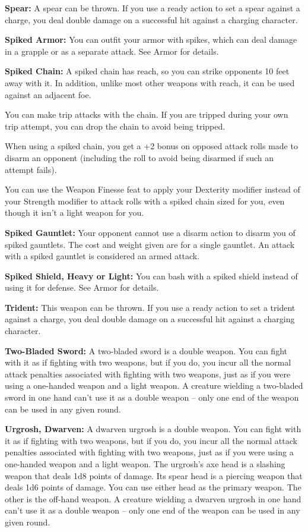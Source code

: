 \textbf{Spear:} A spear can be thrown. If you use a ready action to set a spear 
against a charge, you deal double damage on a successful hit against a charging 
character.

\textbf{Spiked Armor:} You can outfit your armor with spikes, which can deal damage 
in a grapple or as a separate attack. See Armor for details.

\textbf{Spiked Chain:} A spiked chain has reach, so you can strike opponents 10 
feet away with it. In addition, unlike most other weapons with reach, it can be 
used against an adjacent foe.

You can make trip attacks with the chain. If you are tripped during your own trip 
attempt, you can drop the chain to avoid being tripped.

When using a spiked chain, you get a +2 bonus on opposed attack rolls made to disarm 
an opponent (including the roll to avoid being disarmed if such an attempt fails).

You can use the Weapon Finesse feat to apply your Dexterity modifier instead of 
your Strength modifier to attack rolls with a spiked chain sized for you, even 
though it isn't a light weapon for you.

\textbf{Spiked Gauntlet:} Your opponent cannot use a disarm action to disarm you 
of spiked gauntlets. The cost and weight given are for a single gauntlet. An attack 
with a spiked gauntlet is considered an armed attack.

\textbf{Spiked Shield, Heavy or Light:} You can bash with a spiked shield instead 
of using it for defense. See Armor for details.

\textbf{Trident:} This weapon can be thrown. If you use a ready action to set a 
trident against a charge, you deal double damage on a successful hit against a 
charging character.

\textbf{Two-Bladed Sword:} A two-bladed sword is a double weapon. You can fight 
with it as if fighting with two weapons, but if you do, you incur all the normal 
attack penalties associated with fighting with two weapons, just as if you were 
using a one-handed weapon and a light weapon. A creature wielding a two-bladed 
sword in one hand can't use it as a double weapon -- only one end of the weapon 
can be used in any given round.

\textbf{Urgrosh, Dwarven:} A dwarven urgrosh is a double weapon. You can fight 
with it as if fighting with two weapons, but if you do, you incur all the normal 
attack penalties associated with fighting with two weapons, just as if you were 
using a one-handed weapon and a light weapon. The urgrosh's axe head is a slashing 
weapon that deals 1d8 points of damage. Its spear head is a piercing weapon that 
deals 1d6 points of damage. You can use either head as the primary weapon. The 
other is the off-hand weapon. A creature wielding a dwarven urgrosh in one hand 
can't use it as a double weapon -- only one end of the weapon can be used in any 
given round.

